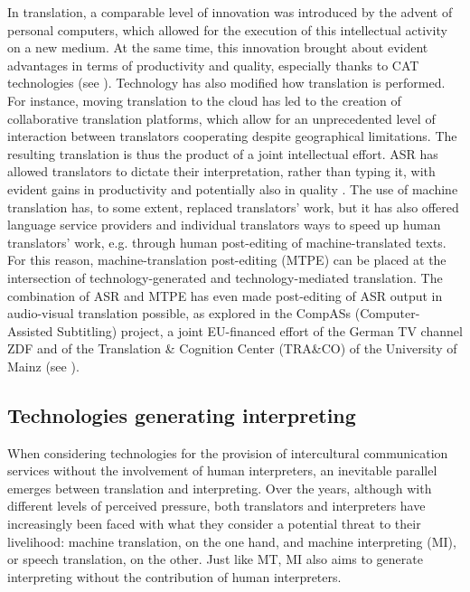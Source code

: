 In translation, a comparable level of innovation was introduced by the advent of personal computers, which allowed for the execution of this intellectual activity on a new medium. At the same time, this innovation brought about evident advantages in terms of productivity and quality, especially thanks to CAT technologies (see ). Technology has also modified how translation is performed. For instance, moving translation to the cloud has led to the creation of collaborative translation platforms, which allow for an unprecedented level of interaction between translators cooperating despite geographical limitations. The resulting translation is thus the product of a joint intellectual effort. ASR has allowed translators to dictate their interpretation, rather than typing it, with evident gains in productivity and potentially also in quality \citep{carl_comparing_2016}. The use of machine translation has, to some extent, replaced translators' work, but it has also offered language service providers and individual translators ways to speed up human translators' work, e.g. through human post-editing of machine-translated texts. For this reason, machine-translation post-editing (MTPE) can be placed at the intersection of technology-generated and technology-mediated translation. The combination of ASR and MTPE has even made post-editing of ASR output in audio-visual translation possible, as explored in the CompASs (Computer-Assisted Subtitling) project, a joint EU-financed effort of the German TV channel ZDF and of the Translation \& Cognition Center (TRA\&CO) of the University of Mainz (see \citealt{tardel_automatization_2018,tardel_attention_2021}).


\subsection{Technologies generating interpreting} \label{tech_generation}
When considering technologies for the provision of intercultural communication services without the involvement of human interpreters, an inevitable parallel emerges between translation and interpreting. Over the years, although with different levels of perceived pressure, both translators and interpreters have increasingly been faced with what they consider a potential threat to their livelihood: machine translation, on the one hand, and machine interpreting (MI), or speech translation, on the other. Just like MT, MI also aims to generate interpreting without the contribution of human interpreters. 


